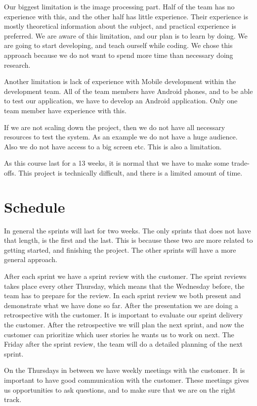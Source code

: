 \documentclass{report}
\begin{document}
Our biggest limitation is the image processing part. Half of the team has no experience with this, and the other half has little experience. Their experience is mostly theoretical information about the subject, and practical experience is preferred. We are aware of this limitation, and our plan is to learn by doing. We are going to start developing, and teach ourself while coding. We chose this approach because we do not want to spend more time than necessary doing research.

Another limitation is lack of experience with Mobile development within the development team. All of the team members have Android phones, and to be able to test our application, we have to develop an Android application. Only one team member have experience with this. 


If we are not scaling down the project, then we do not have all necessary resources to test the system. As an example we do not have a huge audience. Also  we do not have access to a big screen etc. This is also a limitation.  

As this course last for a 13 weeks, it is normal that we have to make some trade-offs.
This project is technically difficult, and there is a limited amount of time.  
  
\section{Schedule}

In general the sprints will last for two weeks. The only sprints that does not have that length, is the first and the last. This is because these two are more related to getting started, and finishing the project. The other sprints will have a more general approach. 

After each sprint we have a sprint review with the customer. The sprint reviews takes place every other Thursday, which means that the Wednesday before, the team has to prepare for the review. In each sprint review we both present and demonstrate what we have done so far. After the presentation we are doing a retrospective with the customer. It is important to evaluate our sprint delivery the customer. After the retrospective we will plan the next sprint, and now the customer can prioritize which user stories he wants us to work on next. The Friday after the sprint review, the team will do a detailed planning of the next sprint. 

On the Thursdays in between we have weekly meetings with the customer. It is important to have good communication with the customer. These meetings gives us opportunities to ask questions, and to make sure that we are on the right track.
\end{document}
